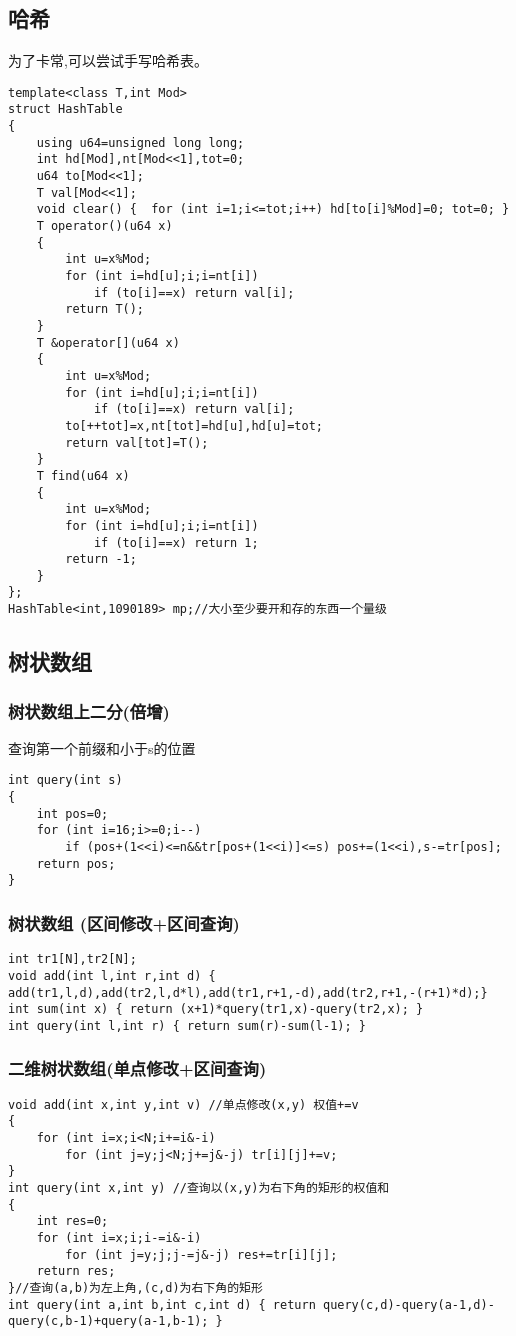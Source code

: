 \documentclass[a4paper]{ctexart}
\begin{document}
\subsection{哈希}
为了卡常,可以尝试手写哈希表。
\begin{lstlisting}
template<class T,int Mod>
struct HashTable 
{
    using u64=unsigned long long;
    int hd[Mod],nt[Mod<<1],tot=0;
    u64 to[Mod<<1];
    T val[Mod<<1];
    void clear() {  for (int i=1;i<=tot;i++) hd[to[i]%Mod]=0; tot=0; }
    T operator()(u64 x) 
    {
        int u=x%Mod;
        for (int i=hd[u];i;i=nt[i])
            if (to[i]==x) return val[i];
        return T();
    }
    T &operator[](u64 x)
    {
        int u=x%Mod;
        for (int i=hd[u];i;i=nt[i])
            if (to[i]==x) return val[i];
        to[++tot]=x,nt[tot]=hd[u],hd[u]=tot;
        return val[tot]=T();
    }
    T find(u64 x)
    {
        int u=x%Mod;
        for (int i=hd[u];i;i=nt[i])
            if (to[i]==x) return 1;
        return -1;
    }
};
HashTable<int,1090189> mp;//大小至少要开和存的东西一个量级
\end{lstlisting}

\subsection{树状数组}

\subsubsection{树状数组上二分(倍增)}
查询第一个前缀和小于s的位置
\begin{lstlisting}
int query(int s)
{
	int pos=0;
	for (int i=16;i>=0;i--)
		if (pos+(1<<i)<=n&&tr[pos+(1<<i)]<=s) pos+=(1<<i),s-=tr[pos];
	return pos;
}
\end{lstlisting}
\subsubsection{树状数组 (区间修改+区间查询)}
\begin{lstlisting}
int tr1[N],tr2[N];
void add(int l,int r,int d) { add(tr1,l,d),add(tr2,l,d*l),add(tr1,r+1,-d),add(tr2,r+1,-(r+1)*d);}
int sum(int x) { return (x+1)*query(tr1,x)-query(tr2,x); }
int query(int l,int r) { return sum(r)-sum(l-1); }
\end{lstlisting}

\subsubsection{二维树状数组(单点修改+区间查询)}
\begin{lstlisting}
void add(int x,int y,int v) //单点修改(x,y) 权值+=v
{
	for (int i=x;i<N;i+=i&-i)
		for (int j=y;j<N;j+=j&-j) tr[i][j]+=v;
}
int query(int x,int y) //查询以(x,y)为右下角的矩形的权值和
{
	int res=0;
	for (int i=x;i;i-=i&-i)
		for (int j=y;j;j-=j&-j) res+=tr[i][j];
	return res;
}//查询(a,b)为左上角,(c,d)为右下角的矩形
int query(int a,int b,int c,int d) { return query(c,d)-query(a-1,d)-query(c,b-1)+query(a-1,b-1); }
\end{lstlisting}
\end{document}

